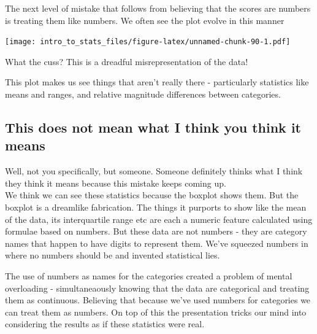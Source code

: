 \documentclass[
]{book}
\newenvironment{Shaded}{\begin{snugshade}}{\end{snugshade}}
\newcommand{\DataTypeTok}[1]{\textcolor[rgb]{0.13,0.29,0.53}{#1}}
\newcommand{\KeywordTok}[1]{\textcolor[rgb]{0.13,0.29,0.53}{\textbf{#1}}}
\newcommand{\NormalTok}[1]{#1}
\newcommand{\OperatorTok}[1]{\textcolor[rgb]{0.81,0.36,0.00}{\textbf{#1}}}
\newcommand{\StringTok}[1]{\textcolor[rgb]{0.31,0.60,0.02}{#1}}
\begin{document}
The next level of mistake that follows from believing that the scores are numbers is treating them like numbers. We often see the plot evolve in this manner

\begin{Shaded}
\end{Shaded}

\texttt{[image: intro\_to\_stats\_files/figure-latex/unnamed-chunk-90-1.pdf]}

What the cuss? This is a dreadful misrepresentation of the data!

This plot makes us see things that aren't really there - particularly statistics like means and ranges, and relative magnitude differences between categories.

\hypertarget{this-does-not-mean-what-i-think-you-think-it-means}{%
\subsection{This does not mean what I think you think it means}\label{this-does-not-mean-what-i-think-you-think-it-means}}

Well, not you specifically, but someone. Someone definitely thinks what I think they think it means because this mistake keeps coming up.\\
We think we can see these statistics because the boxplot shows them. But the boxplot is a dreamlike fabrication. The things it purports to show like the mean of the data, its interquartile range etc are each a numeric feature calculated using formulae based on numbers. But these data are not numbers - they are category names that happen to have digits to represent them. We've squeezed numbers in where no numbers should be and invented statistical lies.

The use of numbers as names for the categories created a problem of mental overloading - simultaneaously knowing that the data are categorical and treating them as continuous. Believing that because we've used numbers for categories we can treat them as numbers. On top of this the presentation tricks our mind into considering the results as if these statistics were real.
\end{document}
